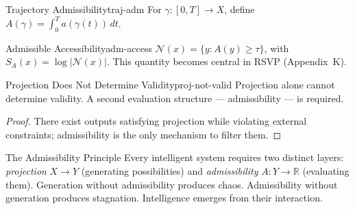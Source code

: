 \begin{definition}{Trajectory Admissibility}{traj-adm}
  For $\gamma : [0,T] \to X$, define
  $A(\gamma) = \int_0^T a(\gamma(t))\,dt$.
\end{definition}

\begin{definition}{Admissible Accessibility}{adm-access}
  $\mathcal{N}(x) = \{y : A(y) \geq \tau\}$, with
  $S_A(x) = \log |\mathcal{N}(x)|$.
  This quantity becomes central in RSVP (Appendix~K).
\end{definition}

\begin{theorem}{Projection Does Not Determine Validity}{proj-not-valid}
  Projection alone cannot determine validity. A second evaluation
  structure — admissibility — is required.
\end{theorem}
\begin{proof}
  There exist outputs satisfying projection while violating external
  constraints; admissibility is the only mechanism to filter them.
\end{proof}

\begin{namedthm}{The Admissibility Principle}
  Every intelligent system requires two distinct layers:
  \emph{projection} $X \to Y$ (generating possibilities) and
  \emph{admissibility} $A : Y \to \mathbb{R}$ (evaluating them).
  Generation without admissibility produces chaos.
  Admissibility without generation produces stagnation.
  Intelligence emerges from their interaction.
\end{namedthm}
